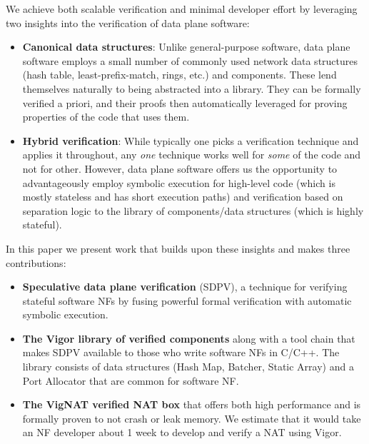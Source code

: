 \documentclass[letterpaper,twocolumn,10pt]{article}
\newcommand{\vignat}{{\sc VigNAT}\xspace}
\begin{document}
We achieve both scalable verification and minimal developer effort by leveraging two insights into the verification of data plane software:
\begin{itemize}
    \item {\bf Canonical data structures}: Unlike general-purpose software, data plane software employs a small number of commonly used network data structures (hash table, least-prefix-match, rings, etc.) and components. These lend themselves naturally to being abstracted into a library. They can be formally verified a priori, and their proofs then automatically leveraged for proving properties of the code that uses them.
    \item {\bf Hybrid verification}: While typically one picks a verification technique and applies it throughout, any {\em one} technique works well for {\em some} of the code and not for other. However, data plane software offers us the opportunity to advantageously employ symbolic execution for high-level code (which is mostly stateless and has short execution paths) and verification based on separation logic to the library of components/data structures (which is highly stateful).
     
\end{itemize}

In this paper we present work that builds upon these insights and makes three contributions:
\begin{itemize}
    \item {\bf Speculative data plane verification} (SDPV), a technique for verifying stateful software NFs by fusing powerful formal verification with automatic symbolic execution. %
    \item {\bf The Vigor library of verified components} along with a tool chain
      that makes SDPV available to those who write software NFs in C/C++.
      The library consists of data structures (Hash Map, Batcher, Static Array) and a Port Allocator that are common for software NF. %
    \item {\bf The \vignat verified NAT box} that offers both high performance and is formally proven to not crash or leak memory. We estimate that it would take an NF developer about 1 week to develop and verify a NAT using Vigor.
\end{itemize}
\end{document}
